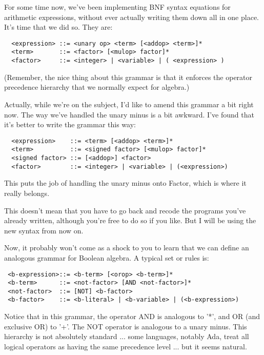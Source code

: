 For some time  now, we've been implementing BNF syntax equations for arithmetic expressions, without  ever  actually  writing them down all in one place. It's time that we did so. They are:

\begin{verbatim}
  <expression> ::= <unary op> <term> [<addop> <term>]*
  <term>       ::= <factor> [<mulop> factor]*
  <factor>     ::= <integer> | <variable> | ( <expression> )
\end{verbatim}

(Remember, the nice thing about  this grammar is that it enforces the operator precedence hierarchy  that  we  normally  expect for algebra.)

Actually, while we're on the subject, I'd  like  to  amend  this grammar a bit right now. The  way we've handled the unary minus is  a  bit  awkward. I've found that it's better  to  write  the grammar this way:

{\small
\begin{verbatim}
  <expression>    ::= <term> [<addop> <term>]*
  <term>          ::= <signed factor> [<mulop> factor]*
  <signed factor> ::= [<addop>] <factor>
  <factor>        ::= <integer> | <variable> | (<expression>)
\end{verbatim} }

This puts the job of handling the unary minus onto  Factor, which is where it really belongs.

This  doesn't  mean  that  you  have  to  go  back and recode the programs you've already written, although you're free to do so if you like. But I will be using the new syntax from now on.

Now, it probably won't come as  a  shock  to you to learn that we can define an analogous grammar for Boolean algebra. A typical set or rules is:

{\small
\begin{verbatim}
 <b-expression>::= <b-term> [<orop> <b-term>]*
 <b-term>      ::= <not-factor> [AND <not-factor>]*
 <not-factor>  ::= [NOT] <b-factor>
 <b-factor>    ::= <b-literal> | <b-variable> | (<b-expression>)
\end{verbatim} }

Notice that in this  grammar, the  operator  AND is analogous to '*', and  OR  (and exclusive OR) to '+'. The  NOT  operator  is analogous to a unary  minus. This  hierarchy is not absolutely standard ... some  languages, notably  Ada, treat  all logical operators  as  having  the same precedence level ... but it seems natural.

